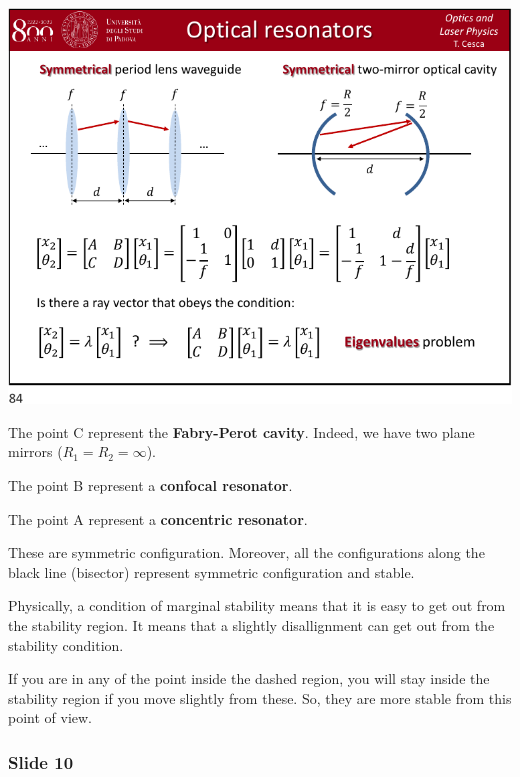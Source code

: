 \documentclass[../main/main.tex]{subfiles}
\begin{document}
\begin{minipage}[]{0.5\linewidth}
\centering
\includegraphics[page=9,width=1\textwidth]{../lessons/pdf_file/21_lecture.pdf}
\end{minipage}
\hspace{0.3cm}\vspace{0.3cm}
\begin{minipage}[c]{0.47\linewidth}

The point C represent the \textbf{Fabry-Perot cavity}. Indeed, we have two plane mirrors (\( R_1 = R_2 = \infty  \)).

The point B represent a \textbf{confocal resonator}.

The point A represent a \textbf{concentric resonator}.

These are symmetric configuration.
Moreover, all the configurations along the black line (bisector) represent symmetric configuration and stable.

Physically, a condition of marginal stability means that it is easy to get out from the stability region. It means that a slightly disallignment can get out from the stability condition.

If you are in any of the point inside the dashed region, you will stay inside the stability region if you move slightly from these. So, they are more stable from this point of view.

\end{minipage}

\subsubsection*{Slide 10}
\end{document}
